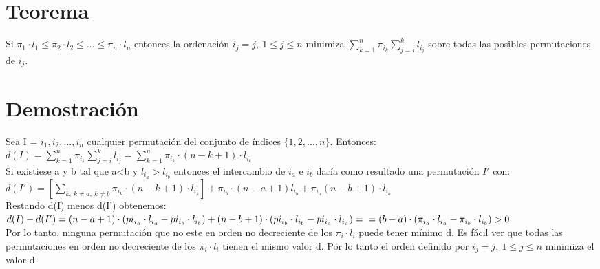 \documentclass[a4paper, 12pt]{article}
\begin{document}
\section*{Teorema}

Si $\pi_1 \cdot l_1 \leq \pi_2 \cdot l_2 \leq ... \leq \pi_n \cdot l_n$ entonces la ordenación $i_j = j, \ 1 \leq j \leq n$ minimiza 
$\sum_{k=1}^{n} \pi_{i_k} \sum_{j=i}^{k}l_{i_j}$ sobre todas las posibles permutaciones de $i_j$.

\section*{Demostración}
Sea I = $i_1, i_2, ..., i_n$ cualquier permutación del conjunto de índices $\{1,2,...,n\}$. Entonces: \\
$d(I) = \sum_{k=1}^{n} \pi_{i_k} \sum_{j=i}^{k}l_{i_j} = \sum_{k=1}^{n}\pi_{i_k} \cdot (n-k+1)\cdot l_{i_k}$ \\
Si existiese a y b tal que a<b y $l_{i_a}>l_{i_b}$ entonces el intercambio de $i_a$ e $i_b$ daría como resultado una permutación $I'$ con: \\
$d(I') = [\sum_{k, \ k\neq a, \ k\neq b}^{}\pi_{i_k}\cdot (n-k+1)\cdot l_{i_k}] + \pi_{i_b}\cdot (n-a+1)l_{i_b} + \pi_{i_a}(n-b+1)\cdot l_{i_a}$ \\
Restando d(I) menos d(I') obtenemos: \\
$d(I)-d(I') = (n-a+1)\cdot (pi_{i_a}\cdot l_{i_a} - pi_{i_b}\cdot l_{i_b}) + (n-b+1)\cdot (pi_{i_b}\cdot l_{i_b} - pi_{i_a}\cdot l_{i_a}) = \\ =(b-a)\cdot (\pi_{i_a} \cdot l_{i_a} - \pi_{i_b} \cdot l_{i_b})>0$ \\ Por lo tanto, ninguna permutación que no este en orden no decreciente de los $\pi_i \cdot l_i$ puede tener mínimo d. Es fácil ver que todas las permutaciones en orden no decreciente de los $\pi_i \cdot l_i$ tienen el mismo valor d. Por lo tanto el orden definido por $i_j = j, \ 1\leq j\leq n$ minimiza el valor d.
\end{document}

